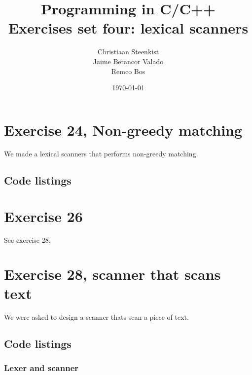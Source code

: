 \documentclass[11pt]{article}
\begin{document}
\title{Programming in C/C++ \\
       Exercises set four: lexical scanners
}
\date{\today}
\author{Christiaan Steenkist \\
Jaime Betancor Valado \\
Remco Bos \\
}

\maketitle
\section*{Exercise 24, Non-greedy matching}
We made a lexical scanners that performs non-greedy matching.

\subsection*{Code listings}





\section*{Exercise 26}
See exercise 28.

\section*{Exercise 28, scanner that scans text}
We were asked to design a scanner thats scan a piece of text.

\subsection*{Code listings}







\subsubsection*{Lexer and scanner}


\end{document}
